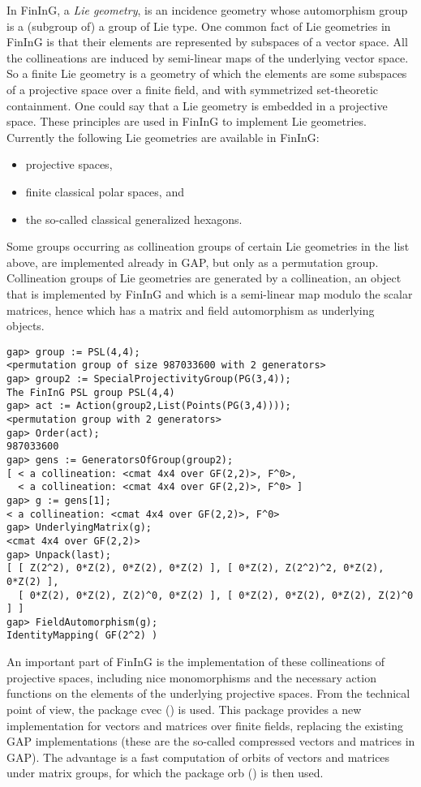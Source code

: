 \documentclass{article}
\def\fining{{\sf FinInG}}
\begin{document}
In \fining{}, a {\em Lie geometry}, is an incidence geometry whose automorphism group is a (subgroup of) a group
of Lie type. One common fact of Lie geometries in \fining{} is that their elements are represented by subspaces of a 
vector space. All the collineations are induced by semi-linear 
maps of the underlying vector space. So a finite Lie geometry is a geometry of which the elements are some subspaces 
of a projective space over a finite field, and with symmetrized set-theoretic containment. One could say that a Lie geometry
is embedded in a projective space. These principles are used in \fining{} to implement Lie geometries. Currently the following
Lie geometries are available in \fining{}:
\begin{itemize}
\item projective spaces,
\item finite classical polar spaces, and
\item the so-called classical generalized hexagons.
\end{itemize}

Some groups occurring as collineation groups of certain Lie geometries in the list above, are implemented already in GAP, but only
as a permutation group. Collineation groups of Lie geometries are generated by a collineation, an object that is implemented by \fining{}
and which is a semi-linear map modulo the scalar matrices, hence which has a matrix and field automorphism as underlying
objects. 

\begin{verbatim}
gap> group := PSL(4,4);                          
<permutation group of size 987033600 with 2 generators>
gap> group2 := SpecialProjectivityGroup(PG(3,4));
The FinInG PSL group PSL(4,4)
gap> act := Action(group2,List(Points(PG(3,4))));
<permutation group with 2 generators>
gap> Order(act);
987033600
gap> gens := GeneratorsOfGroup(group2);
[ < a collineation: <cmat 4x4 over GF(2,2)>, F^0>, 
  < a collineation: <cmat 4x4 over GF(2,2)>, F^0> ]
gap> g := gens[1];
< a collineation: <cmat 4x4 over GF(2,2)>, F^0>
gap> UnderlyingMatrix(g);
<cmat 4x4 over GF(2,2)>
gap> Unpack(last);
[ [ Z(2^2), 0*Z(2), 0*Z(2), 0*Z(2) ], [ 0*Z(2), Z(2^2)^2, 0*Z(2), 0*Z(2) ], 
  [ 0*Z(2), 0*Z(2), Z(2)^0, 0*Z(2) ], [ 0*Z(2), 0*Z(2), 0*Z(2), Z(2)^0 ] ]
gap> FieldAutomorphism(g);
IdentityMapping( GF(2^2) )
\end{verbatim} 

An important part of \fining{} is the implementation of these collineations of projective spaces, including nice monomorphisms
and the necessary action functions on the elements of the underlying projective spaces. From the technical point of view, 
the package cvec (\cite{cvec}) is used. This package provides a new implementation for vectors and matrices over finite 
fields, replacing the existing GAP implementations (these are the so-called compressed vectors and matrices in GAP). The advantage
is a fast computation of orbits of vectors and matrices under matrix groups, for which the package orb (\cite{orb}) is then used.
\end{document}
